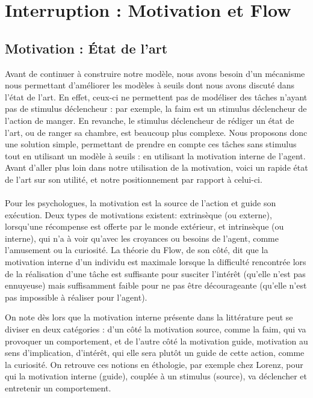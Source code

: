 	\section{Interruption : Motivation et Flow}
	\label{sectionInterruption}
	
	\subsection{Motivation : État de l'art}

Avant de continuer à construire notre modèle, nous avons besoin d'un mécanisme nous permettant d'améliorer les modèles à seuils dont nous avons discuté dans l'état de l'art. En effet, ceux-ci ne permettent pas de modéliser des tâches n'ayant pas de stimulus déclencheur : par exemple, la faim est un stimulus déclencheur de l'action de manger. En revanche, le stimulus déclencheur de rédiger un état de l'art, ou de ranger sa chambre, est beaucoup plus complexe. Nous proposons donc une solution simple, permettant de prendre en compte ces tâches sans stimulus tout en utilisant un modèle à seuils : en utilisant la motivation interne de l'agent. Avant d'aller plus loin dans notre utilisation de la motivation, voici un rapide état de l'art sur son utilité, et notre positionnement par rapport à celui-ci.

\paragraph{}
Pour les psychologues, la motivation est la source de l'action et guide son exécution. Deux types de motivations existent: extrinsèque (ou externe), lorsqu'une récompense est offerte par le monde extérieur, et intrinsèque (ou interne), qui n'a à voir qu'avec les croyances ou besoins de l'agent, comme l'amusement ou la curiosité. La théorie du Flow\cite{csikszentmihalyi_finding_1997}, de son côté, dit que la motivation interne d'un individu est maximale lorsque la difficulté rencontrée lors de la réalisation d'une tâche est suffisante pour susciter l'intérêt (qu'elle n'est pas ennuyeuse) mais suffisamment faible pour ne pas être décourageante (qu'elle n'est pas impossible à réaliser pour l'agent). 

On note dès lors que la motivation interne présente dans la littérature peut se diviser en deux catégories : d'un côté la motivation source, comme la faim, qui va provoquer un comportement, et de l'autre côté la motivation guide, motivation au sens d'implication, d'intérêt, qui elle sera plutôt un guide de cette action, comme la curiosité. On retrouve ces notions en éthologie, par exemple chez Lorenz\cite{lorenz_les_1984}, pour qui la motivation interne (guide), couplée à un stimulus (source), va déclencher et entretenir un comportement.
        

